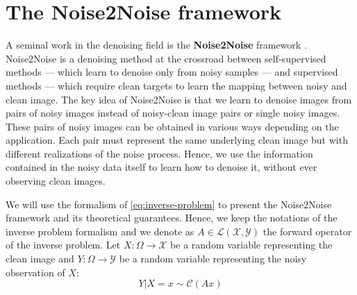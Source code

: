 

\section{The Noise2Noise framework}

A seminal work in the denoising field is the \textbf{Noise2Noise} framework \cite{lehtinen_noise2noise_2018}.
Noise2Noise is a denoising method at the crossroad between self-supervised methods — which learn to denoise only from noisy samples — and supervised methods — which require clean targets to learn the mapping between noisy and clean image.
The key idea of Noise2Noise is that we learn to denoise images from pairs of noisy images instead of noisy-clean image pairs or single noisy images.
These pairs of noisy images can be obtained in various ways depending on the application. Each pair must represent the same underlying clean image but with different realizations of the noise process.
Hence, we use the information contained in the noisy data itself to learn how to denoise it, without ever observing clean images.

We will use the formalism of \eqref{eq:inverse-problem} to present the Noise2Noise framework and its theoretical guarantees.
Hence, we keep the notations of the inverse problem formalism and we denote as $A \in \mathcal{L}(\mathcal{X}, \mathcal{Y})$ the forward operator of the inverse problem.
Let $X: \Omega \to \mathcal{X}$ be a random variable representing the clean image and $Y: \Omega \to \mathcal{Y}$ be a random variable representing the noisy observation of $X$:
\begin{equation}
    Y | X=x \sim \mathcal{C}(Ax)
    \label{eq:noise-model}
\end{equation}

